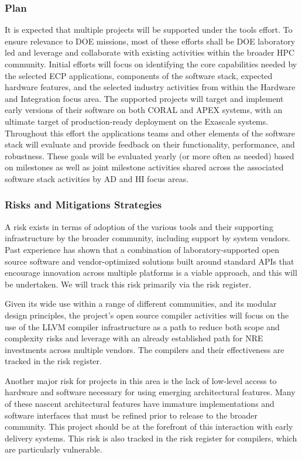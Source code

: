 \subsubsection{Plan}
It is expected that multiple projects will be supported under the tools effort. To ensure relevance to DOE missions, most of these efforts shall be DOE laboratory led and leverage and collaborate with existing activities within the broader HPC community. Initial efforts will focus on identifying the core capabilities needed by the selected ECP applications, components of the software stack, expected hardware features, and the selected industry activities from within the Hardware and Integration focus area. The supported projects will target and implement early versions of their software on both CORAL and APEX systems, with an ultimate target of production-ready deployment on the Exascale systems. Throughout this effort the applications teams and other elements of the software stack will evaluate and provide feedback on their functionality, performance, and robustness. These goals will be evaluated yearly (or more often as needed) based on milestones as well as joint milestone activities shared across the associated software stack activities by AD and HI focus areas.

\subsubsection{Risks and Mitigations Strategies}

A risk exists in terms of adoption of the various tools and their supporting infrastructure by the broader community, including support by system vendors. Past experience has shown that a combination of laboratory-supported open source software and vendor-optimized solutions built around standard APIs that encourage innovation across multiple platforms is a viable approach, and this will be undertaken. We will track this risk primarily via the risk register.

Given its wide use within a range of different communities, and its modular design principles, the project's open source compiler activities will focus on the use of the LLVM compiler infrastructure as a path to reduce both scope and complexity risks and leverage with an already established path for NRE investments across multiple vendors. The compilers and their effectiveness are tracked in the risk register. 

Another major risk for projects in this area is the lack of low-level access to hardware and software necessary for using emerging architectural features. Many of these nascent architectural features have immature implementations and software interfaces that must be refined prior to release to the broader community. This project should be at the forefront of this interaction with early delivery systems. This risk is also tracked in the risk register for compilers, which are particularly vulnerable.

